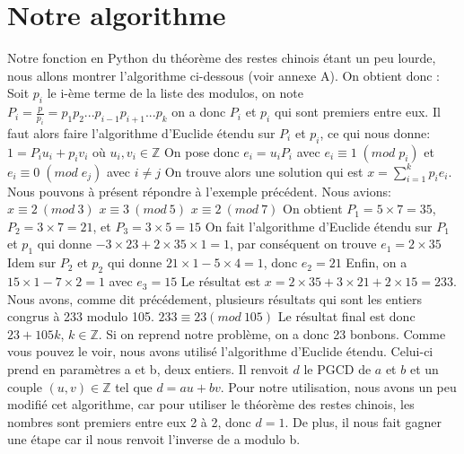 \documentclass[a4paper, 11pt]{report}
\begin{document}
\newpage

\section{Notre algorithme}
Notre fonction en Python du théorème des restes chinois étant un peu lourde,
nous allons montrer l'algorithme ci-dessous (voir annexe A).
On obtient donc :
\newline
Soit $p_i$ le i-ème terme de la liste des modulos, on note \newline
$ P_i=\frac{p}{p_i}=p_1 p_2 ... p_{i-1} p_{i+1} ... p_k $   \newline
on a donc $P_i$ et $p_i$  qui sont premiers entre eux. \newline
Il faut alors faire l'algorithme d'Euclide étendu sur $P_i$ et $p_i$, ce qui nous donne: 
$1= P_i u_i + p_i v_i$ 
où 
$u_i, v_i \in  \mathbb{Z}  $
\newline
On pose donc $e_i = u_i P_i$ avec $ e_i \equiv 1 \; (mod \; p_i)$ et $ e_i\equiv 0 \; (mod \; e_j)$ avec $ i\neq j$ \newline
On trouve alors une solution qui est $x=\sum_{i = 1}^{k}{p_i e_i} $.\newline
\newline
\newline
Nous pouvons à présent répondre à l'exemple précédent. Nous avions: \newline
$ x\equiv 2 \: (mod \:  3)$ 
\newline
$ x\equiv 3 \: (mod \: 5)$
\newline
$ x \equiv 2 \:(mod\: 7)$
\newline
On obtient $P_1=5\times 7=35$, $P_2=3\times 7=21 $, et $P_3=3\times 5=15$ \newline
On fait l'algorithme d'Euclide étendu sur $P_1$ et $p_1$ qui donne $-3\times 23 +2\times 35\times 1= 1 $, par conséquent on trouve $e_1=2\times 35$ \newline
Idem sur $P_2$ et $p_2$ qui donne $21\times 1 - 5\times 4=1$, donc $e_2=21$ \newline
Enfin, on a $15\times 1- 7\times 2 = 1 $ avec $e_3=15$ \newline
Le résultat est $x=2\times 35 + 3\times 21 + 2\times 15 =233$.
Nous avons, comme dit précédement, plusieurs résultats qui sont les entiers congrus à 233 modulo 105. \newline
$233\equiv 23 (mod \: 105)$ \newline
Le résultat final est donc $23+105k$, $k \in \mathbb{Z} $.
Si on reprend notre problème, on a donc 23 bonbons.
\newline
\newline
Comme vous pouvez le voir, nous avons utilisé l'algorithme d'Euclide étendu. Celui-ci prend en paramètres a et b, deux entiers.
Il renvoit $d$ le PGCD de $a$ et $b$ et un couple $(u,v) \in \mathbb{Z} $ tel que $d=au+bv$.
\newline
Pour notre utilisation, nous avons un peu modifié cet algorithme, car pour utiliser le théorème des restes chinois, les nombres sont premiers entre eux 2 à 2,
donc $d=1$. De plus, il nous fait gagner une étape car il nous renvoit l'inverse de a modulo b.
\end{document}
